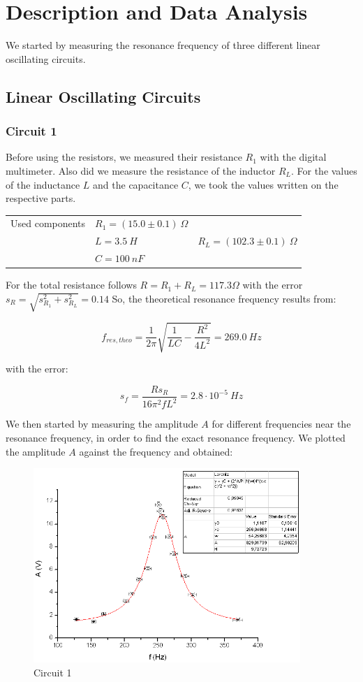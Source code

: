 \clearpage
\section{Description and Data Analysis}

We started by measuring the resonance frequency of three different linear oscillating circuits.

\subsection{Linear Oscillating Circuits}

\subsubsection{Circuit 1}

Before using the resistors, we measured their resistance $R_1$ with the digital multimeter. Also did we measure the resistance of the inductor $R_L$. For the values of the inductance $L$ and the capacitance $C$, we took the values written on the respective parts.

\begin{tabular}{l l l}
Used components & $R_1 = (15.0 \pm 0.1)\ \Omega$ & \\
 & $L=3.5\ H$ & $R_L = (102.3 \pm 0.1)\ \Omega$\\
 & $C=100\ nF$ & \\
\end{tabular}

For the total resistance follows $R = R_1 + R_L = 117.3 \Omega$ with the error $s_R = \sqrt{s_{R_1}^2 + s_{R_L}^2} = 0.14$ 
So, the theoretical resonance frequency results from:

$$f_{res,theo} = \frac{1}{2\pi}\sqrt{\frac{1}{LC}-\frac{R^2}{4L^2}} = 269.0\ Hz$$

with the error:

$$s_f = \frac{Rs_R}{16\pi^2fL^2} = 2.8\cdot 10^{-5}\ Hz$$

We then started by measuring the amplitude $A$ for different frequencies near the resonance frequency, in order to find the exact resonance frequency. We plotted the amplitude $A$ against the frequency and obtained:

\begin{figure}[H]
\centering \includegraphics[width=0.9\textwidth]{Bilder/1a.png}
\caption{Circuit 1}
\end{figure}

